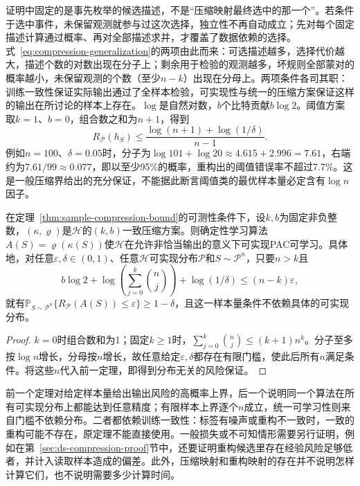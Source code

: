 证明中固定的是事先枚举的候选描述，不是“压缩映射最终选中的那一个”。若条件于选中事件，未保留观测就参与过这次选择，独立性不再自动成立；先对每个固定描述计算通过概率、再对全部描述求并，才覆盖了数据依赖的选择。式~\eqref{eq:compression-generalization}的两项由此而来：可选描述越多，选择代价越大，描述个数的对数出现在分子上；剩余用于检验的观测越多，坏规则全部蒙对的概率越小，未保留观测的个数（至少$n-k$）出现在分母上。两项条件各司其职：训练一致性保证实际输出通过了全样本检验，可实现性与统一的压缩方案保证这样的输出在所讨论的样本上存在。$\log$是自然对数，$b$个比特贡献$b\log2$。阈值方案取$k=1$、$b=0$，组合数之和为$n+1$，得到
\[
 R_{\mathcal P}(h_S)\leq\frac{\log(n+1)+\log(1/\delta)}{n-1}.
\]
例如$n=100$、$\delta=0.05$时，分子为$\log101+\log20\approx4.615+2.996=7.61$，右端约为$7.61/99\approx0.077$，即以至少95\%的概率，重构出的阈值错误率不超过7.7\%。这是一般压缩界给出的充分保证，不能据此断言阈值类的最优样本量必定含有$\log n$因子。

\begin{theorem}[有界样本压缩推出PAC可学习]
\label{thm:compression-pac-learning}
在定理~\ref{thm:sample-compression-bound}的可测性条件下，设$k,b$为固定非负整数，$(\kappa,\varrho)$是$\mathcal H$的$(k,b)$一致压缩方案。则确定性学习算法$A(S)=\varrho(\kappa(S))$使$\mathcal H$在允许非恰当输出的意义下可实现PAC可学习。具体地，对任意$\varepsilon,\delta\in(0,1)$、任意$\mathcal H$可实现分布$\mathcal P$和$S\sim\mathcal P^n$，只要$n>k$且
\[
 b\log2+\log\!\left(\sum_{j=0}^k\binom nj\right)+\log(1/\delta)\leq(n-k)\varepsilon,
\]
就有$\mathbb P_{S\sim\mathcal P^n}\{R_{\mathcal P}(A(S))\leq\varepsilon\}\geq1-\delta$，且这一样本量条件不依赖具体的可实现分布。
\end{theorem}

\begin{proof}
$k=0$时组合数和为1；固定$k\geq1$时，$\sum_{j=0}^k\binom nj\leq(k+1)n^k$。分子至多按$\log n$增长，分母按$n$增长，故任意给定$\varepsilon,\delta$都存在有限门槛，使此后所有$n$满足条件。将这些$n$代入前一定理，即得到分布无关的风险保证。
\end{proof}

前一个定理对给定样本量给出输出风险的高概率上界，后一个说明同一个算法在所有可实现分布上都能达到任意精度；有限样本上界逐个$n$成立，统一可学习性则来自门槛不依赖分布。二者都依赖训练一致性：标签有噪声或重构不一致时，一致的重构可能不存在，原定理不能直接使用。一般损失或不可知情形需要另行证明，例如在第~\ref{sec:ds-compression-proof}节中，还要证明重构候选里存在经验风险足够低者，并计入读取样本造成的偏差。此外，压缩映射和重构映射的存在并不说明怎样计算它们，也不说明需要多少计算时间。
